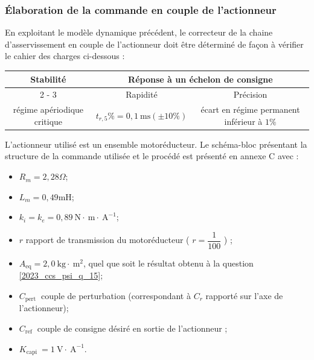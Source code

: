 \else
\fi


\subsubsection{Élaboration de la commande en couple de l'actionneur}
En exploitant le modèle dynamique précédent, le correcteur de la chaine d'asservissement en couple de l'actionneur doit être déterminé de façon à vérifier le cahier des charges ci-dessous :

\begin{center}
\begin{tabular}{|c|c|c|}
\hline
\multirow{2}{*}{Stabilité} & \multicolumn{2}{|c|}{Réponse à un échelon de consigne} \\
\cline { 2 - 3 }
 & Rapidité & Précision \\
\hline
régime apériodique critique & $t_{r, 5} \%=0,1 \mathrm{~ms}( \pm 10 \%)$ & écart en régime permanent inférieur à $1 \%$ \\
\hline
\end{tabular}
\end{center}

L'actionneur utilisé est un ensemble motoréducteur. Le schéma-bloc présentant la structure de la commande utilisée et le procédé est présenté en annexe C avec :

\begin{itemize}
  \item $R_{m}=2,28 \Omega$;
  \item $L_{m}=0,49 \mathrm{mH}$;
  \item $k_{i}=k_{e}=0,89 \mathrm{~N} \cdot \mathrm{~m} \cdot \mathrm{~A}^{-1}$;
  \item $r$ rapport de transmission du motoréducteur ( $r=\dfrac{1}{100}$ ) ;
  \item $A_{\mathrm{eq}}=2,0 \mathrm{~kg} \cdot \mathrm{~m}^{2}$, quel que soit le résultat obtenu à la question \ref{2023_ccs_psi_q_15};
  \item $C_{\text {pert }}$ couple de perturbation (correspondant à $C_{r}$ rapporté sur l'axe de l'actionneur);
  \item $C_{\text {ref }}$ couple de consigne désiré en sortie de l'actionneur ;
  \item $K_{\text {capi }}=1 \mathrm{~V} \cdot \mathrm{~A}^{-1}$.
\end{itemize}

